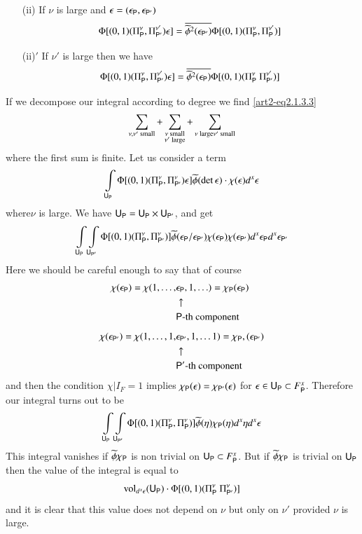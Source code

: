 \begin{itemize}
\begin{itemize}
\item[(ii)] If $\nu$ is large and $\epsilon=(\epsilon_{\mathsf{P}},\epsilon_{\mathsf{P}'})$
$$
\Phi[(0,1)(\Pi^{\nu}_{\mathsf{P}},\Pi^{\nu'}_{\mathsf{P}'})\epsilon]=\overline{\widetilde{\phi}^{2}(\epsilon_{\mathsf{P}'})}\Phi[(0,1)(\Pi^{\nu}_{\mathsf{P}},\Pi^{\nu'}_{\mathsf{P}})]
$$

\item[(ii)$'$] If $\nu'$ is large then we have
$$
\Phi[(0,1)(\Pi^{\nu}_{\mathsf{P}},\Pi^{\nu'}_{\mathsf{P}'})\epsilon]=\overline{\widetilde{\phi}^{2}(\epsilon_{\mathsf{P}})}\Phi[(0,1)(\Pi^{\nu}_{\mathsf{P}} \ \Pi^{\nu'}_{\mathsf{P}'})]
$$
\end{itemize}
\end{itemize}

If we decompose our integral according to degree we find \eqref{art2-eq2.1.3.3}
$$
\sum\limits_{\nu,\nu'\text{~small}}+\sum\limits_{\substack{\nu\text{~small}\\ \nu'\text{~large}}}+\sum\limits_{\nu\text{~large}\\ \nu'\text{~small}}
$$
where the first sum is finite. Let us consider a term
$$
\int\limits_{\mathsf{U}_{\mathsf{P}}}\Phi[(0,1)(\Pi^{\nu}_{\mathsf{P}},\Pi^{\nu}_{\mathsf{P}'})\epsilon]\widetilde{\phi}(\det \epsilon)\cdot \chi(\epsilon)d^{x}\epsilon
$$
where\pageoriginale $\nu$ is large. We have $\mathsf{U}_{\mathsf{P}}=\mathsf{U}_{\mathsf{P}}\times \mathsf{U}_{\mathsf{P}'}$, and get
$$
\int\limits_{\mathsf{U}_{\mathsf{P}}}\int\limits_{\mathsf{U}_{\mathsf{P}'}}\Phi[(0,1)(\Pi^{\nu}_{\mathsf{P}},\Pi^{\nu}_{\mathsf{P}'})]\widetilde{\phi}(\epsilon_{\mathsf{P}}/\epsilon_{\mathsf{P}'})\chi(\epsilon_{\mathsf{P}})\chi(\epsilon_{\mathsf{P}'})d^{x}\epsilon_{\mathsf{P}}d^{x}\epsilon_{\mathsf{P}'}
$$
Here we should be careful enough to say that of course
\begin{align*}
\chi(\epsilon_{\mathsf{P}})=\chi(1,\ldots, & \epsilon_{\mathsf{P}},1,\ldots)=\chi_{\mathsf{P}}(\epsilon_{\mathsf{P}})\\
                                    &\uparrow\\
                                    &\mathsf{P}\text{-th component}\\[5pt]
\chi(\epsilon_{\mathsf{P}'})=\chi(1,\ldots,1, &\epsilon_{\mathsf{P}'},1,\ldots 1)=\chi_{\mathsf{P}},(\epsilon_{\mathsf{P}'})\\
                                      &\uparrow\\
                                      &\mathsf{P}'\text{-th component}
\end{align*}
and then the condition $\chi|I_{F}=1$ implies $\chi_{\mathsf{P}}(\epsilon)=\chi_{\mathsf{P}'}(\epsilon)$ for $\epsilon \in \mathsf{U}_{\mathsf{P}}\subset F^{x}_{\mathsf{P}}$. Therefore our integral turns out to be
$$
\int\limits_{\mathsf{U}_{\mathsf{P}}}\int\limits_{\mathsf{U}_{\mathsf{P}'}}\Phi[(0,1)(\Pi^{\nu}_{\mathsf{P}},\Pi^{\nu}_{\mathsf{P}})]\widetilde{\phi}(\eta)\chi_{\mathsf{P}}(\eta)d^{x}\eta d^{x}\epsilon
$$
This integral vanishes if $\widetilde{\phi}\chi_{\mathsf{P}}$ is non trivial on $\mathsf{U}_{\mathsf{P}}\subset F^{x}_{\mathsf{P}}$. But if $\widetilde{\phi}\chi_{\mathsf{P}}$ is trivial on $\mathsf{U}_{\mathsf{P}}$ then the value of the integral is equal to
$$
\operatorname{vol}_{d^{x}\epsilon}(\mathsf{U}_{\mathsf{P}})\cdot \Phi[(0,1)(\Pi^{\nu}_{\mathsf{P}} \ \Pi^{\nu}_{\mathsf{P}'})]
$$
and it is clear that this value does not depend on $\nu$ but only on $\nu'$ provided $\nu$ is large.

